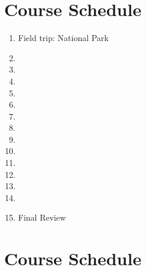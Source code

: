 \documentclass[11pt,article,oneside]{memoir}
\begin{document}
\section{Course Schedule}

\begin{enumerate}
%
%
\item Field trip: National Park
\item 
\item 
\item 
\item 
%
\item 
\item 
\item 
\item 
\item 
%
\item 
\item 
\item 
\item 
\item Final Review
%
\end{enumerate}


\section{Course Schedule}
\end{document}
